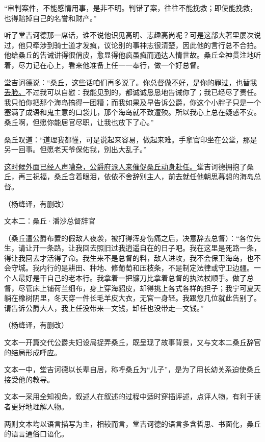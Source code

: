\documentclass[11pt,a4paper]{ctexart}
\begin{document}
\begin{materialtext}
“审判案件，不能感情用事，是非不明。判错了案，往往不能挽救；即使能挽救，也得赔掉自己的名誉和财产。”

听了堂吉诃德那一席话，谁不说他识见高明、志趣高尚呢？可是这部大著里屡次说过，他只牵涉到骑士道才发疯，议论别的事神志很清楚，因此他的言行总不合拍。他给桑丘的告诫讲得很俏皮，愈显得他疯虽疯而通达人情世故。桑丘全神贯注地听着，尽力记在心上，看来他准备上任一一奉行，做一个好总督。

堂吉诃德说：“桑丘，这些话咱们再多说了。\uline{你总督做不好，是你的罪过，也替我丢脸。}不过我可以自慰：我能见到的，都诚诚恳恳地告诫你了；我已经尽了责任。我只怕你把那个海岛搞得一团糟；而我如果及早告诉公爵，你这个小胖子只是一个塞满了成语和鬼主意的口袋儿，那个海岛就不致遭殃。所以我心上总在疑惑不安。桑丘啊，但愿你能居官尽职，让我也放下了心。”

桑丘叹道：“道理我都懂，可是说起来容易，做起来难。手拿官印坐在公堂，那是另一回事。但愿老天爷保佑我，别出大乱子。”

\uline{这时候外面已经人声嘈杂，公爵府派人来催促桑丘动身赴任。}堂吉诃德拥抱了桑丘，再三祝福，桑丘含着眼泪，依依不舍辞别主人，前去就任他朝思暮想的海岛总督。
\end{materialtext}
\begin{flushright}（杨绛译，有删改）\end{flushright}

文本二：桑丘·潘沙总督辞官

\begin{materialtext}
（桑丘遭公爵布置的假敌人夜袭，被打得浑身伤痛之后，决意辞去总督）：“各位先生，请让开一条路，让我回去照旧过我逍遥自在的日子吧。我在这里是死路一条，得让我回去才活得了命。我生来不是总督的料，敌人进攻，我不会保卫海岛，也不会守城。我内行的是耕田、种地、修葡萄和压枝条，不是制定法律或守卫边疆。一个人最好是干自己的老本行。我拿着一把镰刀比拿着总督的执法杖顺手。做了总督，尽管床上铺荷兰细布，身上穿海貂皮，却得挑上各式各样的担子；我宁可夏天躺在橡树阴里，冬天穿一件长毛羊皮大衣，无官一身轻。我跟您几位就此告别了。请告诉公爵大人，我上任没带来一文钱，卸任也没带走一文钱。”
\end{materialtext}
\begin{flushright}（杨绛译，有删改）\end{flushright}

\begin{choices}
\item 文本一开篇交代公爵夫妇设局捉弄桑丘，既呈现了故事背景，又与文本二桑丘辞官的结局形成呼应。
\item 文本一中，堂吉诃德以长辈自居，称呼桑丘为“儿子”，是为了用长幼关系迫使桑丘接受他的教导。
\item 文本一采用全知视角，叙述人在叙述的过程中适时穿插评述，点评人物，有利于读者更好地理解人物。
\item 两则文本均以语言描写为主，相较而言，堂吉诃德的语言多含哲思、书面化，桑丘的语言通俗口语化。
\end{choices}
\end{document}
